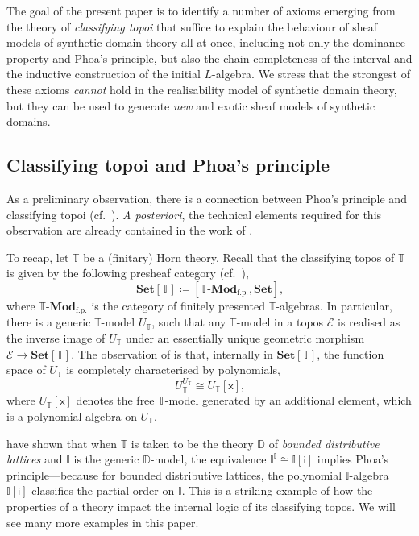 \documentclass[a4paper,12pt]{amsart}
\theoremstyle{definition}
\newcommand{\mc}[1]{\mathcal{#1}}
\newcommand{\mb}[1]{\mathbf{#1}}
\newcommand{\mbb}[1]{\mathbb{#1}}
\newcommand{\T}{\mbb T}
\newcommand{\I}{\mbb I}
\newcommand{\mr}[1]{\mathrm{#1}}
\newcommand{\ms}[1]{\mathsf{#1}}
\newcommand{\Set}{\mb{Set}}
\newcommand{\fp}{_{\mr{f.p.}}}
\newcommand{\mmod}[1]{#1\text{-}\mathbf{Mod}}
\begin{document}
The goal of the present paper is to identify a number of axioms emerging from the theory of \emph{classifying topoi} that suffice to explain the behaviour of sheaf models of synthetic domain theory all at once, including not only the dominance property and Phoa's principle, but also the chain completeness of the interval and the inductive construction of the initial $L$-algebra. We stress that the strongest of these axioms \emph{cannot} hold in the realisability model of synthetic domain theory, but they can be used to generate \emph{new} and exotic sheaf models of synthetic domains.

\subsection{Classifying topoi and Phoa's principle}\label{subsec:classtopphoa}

As a preliminary observation, there is a connection between Phoa's principle and classifying topoi (cf.\ \citet[Lem 3.8]{gratzer2024directed}).
\emph{A posteriori}, the technical elements required for this observation are already contained in the work of \citet{RN879}.

To recap, let $\T$ be a (finitary) Horn theory. Recall that the classifying topos of $\T$ is given by the following presheaf category (cf.\ \citet[D3.1]{johnstone2002sketches}),
\[ \Set[\T] \coloneq [\mmod\T\fp,\Set]\text{,} \]
where $\mmod\T\fp$ is the category of finitely presented $\T$-algebras. In particular, there is a generic $\T$-model $U_\T$, such that any $\T$-model in a topos $\mc E$ is realised as the inverse image of $U_\T$ under an essentially unique geometric morphism $\mc E \to \Set[\T]$. The observation of \citet{RN879} is that, internally in $\Set[\T]$, the function space of $U_\T$ is completely characterised by polynomials,
\[ U_\T^{U_\T} \cong U_\T[\ms{x}]\text{,} \]
where $U_\T[\ms{x}]$ denotes the free $\T$-model generated by an additional element, which is a  polynomial algebra on $U_\T$.

\citet{gratzer2024directed} have shown that when $\T$ is taken to be the theory $\mbb D$ of \emph{bounded distributive lattices} and $\I$ is the generic $\mbb D$-model, the equivalence $\I^\I \cong \I[\ms{i}]$ implies Phoa's principle---because for bounded distributive lattices, the polynomial $\I$-algebra $\I[\ms{i}]$ classifies the partial order on $\I$. This is a striking example of how the properties of a theory impact the internal logic of its classifying topos. We will see many more examples in this paper.
\end{document}
